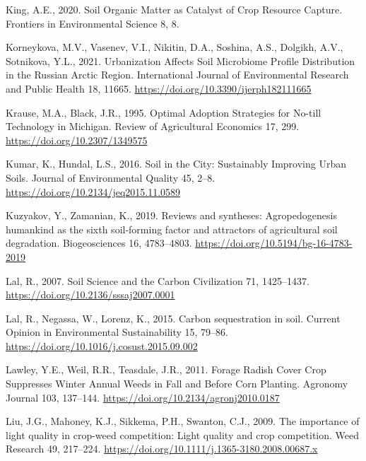 \documentclass[
  12pt,
]{article}
\newlength{\cslhangindent}
\newlength{\cslentryspacingunit} %
\newenvironment{CSLReferences}[2] %
 {%
  \setlength{\parindent}{0pt}
  \ifodd #1
  \let\oldpar\par
  \def\par{\hangindent=\cslhangindent\oldpar}
  \fi
  \setlength{\parskip}{#2\cslentryspacingunit}
 }%
 {}
\begin{document}
\begin{CSLReferences}{1}{0}
\leavevmode{}%
King, A.E., 2020. Soil {Organic Matter} as {Catalyst} of {Crop Resource Capture}. Frontiers in Environmental Science 8, 8.

\leavevmode{}%
Korneykova, M.V., Vasenev, V.I., Nikitin, D.A., Soshina, A.S., Dolgikh, A.V., Sotnikova, Y.L., 2021. Urbanization {Affects Soil Microbiome Profile Distribution} in the {Russian Arctic Region}. International Journal of Environmental Research and Public Health 18, 11665. \url{https://doi.org/10.3390/ijerph182111665}

\leavevmode{}%
Krause, M.A., Black, J.R., 1995. Optimal {Adoption Strategies} for {No-till Technology} in {Michigan}. Review of Agricultural Economics 17, 299. \url{https://doi.org/10.2307/1349575}

\leavevmode{}%
Kumar, K., Hundal, L.S., 2016. Soil in the {City}: {Sustainably Improving Urban Soils}. Journal of Environmental Quality 45, 2--8. \url{https://doi.org/10.2134/jeq2015.11.0589}

\leavevmode{}%
Kuzyakov, Y., Zamanian, K., 2019. Reviews and syntheses: {Agropedogenesis} \textendash{} humankind as the sixth soil-forming factor and attractors of agricultural soil degradation. Biogeosciences 16, 4783--4803. \url{https://doi.org/10.5194/bg-16-4783-2019}

\leavevmode{}%
Lal, R., 2007. Soil {Science} and the {Carbon Civilization} 71, 1425--1437. \url{https://doi.org/10.2136/sssaj2007.0001}

\leavevmode{}%
Lal, R., Negassa, W., Lorenz, K., 2015. Carbon sequestration in soil. Current Opinion in Environmental Sustainability 15, 79--86. \url{https://doi.org/10.1016/j.cosust.2015.09.002}

\leavevmode{}%
Lawley, Y.E., Weil, R.R., Teasdale, J.R., 2011. Forage {Radish Cover Crop Suppresses Winter Annual Weeds} in {Fall} and {Before Corn Planting}. Agronomy Journal 103, 137--144. \url{https://doi.org/10.2134/agronj2010.0187}

\leavevmode{}%
Liu, J.G., Mahoney, K.J., Sikkema, P.H., Swanton, C.J., 2009. The importance of light quality in crop-weed competition: {Light} quality and crop competition. Weed Research 49, 217--224. \url{https://doi.org/10.1111/j.1365-3180.2008.00687.x}


\end{CSLReferences}
\end{document}
